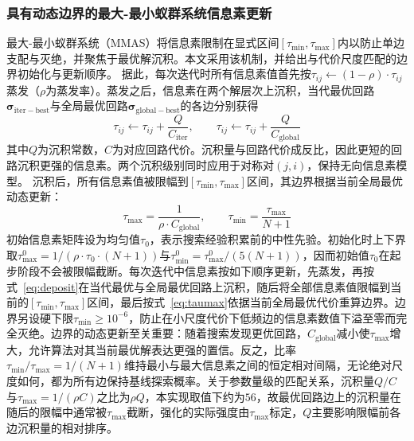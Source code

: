 \documentclass[lettersize,journal]{IEEEtran}
\begin{document}
\subsubsection{具有动态边界的最大-最小蚁群系统信息素更新}
最大-最小蚁群系统（MMAS）\textcolor{blue}{\cite{ref23}}将信息素限制在显式区间$[\tau_{\min}, \tau_{\max}]$内以防止单边支配与灭绝，并聚焦于最优解沉积。本文采用该机制，并给出与代价尺度匹配的边界初始化与更新顺序。
据此，每次迭代时所有信息素值首先按$\tau_{ij} \leftarrow (1 - \rho) \cdot \tau_{ij}$蒸发（$\rho$为蒸发率）。蒸发之后，信息素在两个解层次上沉积，当代最优回路$\bm{\sigma}_{\mathrm{iter-best}}$与全局最优回路$\bm{\sigma}_{\mathrm{global-best}}$的各边分别获得
\begin{equation}
\tau_{ij} \leftarrow \tau_{ij} + \frac{Q}{C_{\mathrm{iter}}}, \qquad
\tau_{ij} \leftarrow \tau_{ij} + \frac{Q}{C_{\mathrm{global}}}
\label{eq:deposit}
\end{equation}
其中$Q$为沉积常数，$C$为对应回路代价。沉积量与回路代价成反比，因此更短的回路沉积更强的信息素。两个沉积级别同时应用于对称对$(j, i)$，保持无向信息素模型。
沉积后，所有信息素值被限幅到$[\tau_{\min}, \tau_{\max}]$区间，其边界根据当前全局最优动态更新：
\begin{equation}
\tau_{\max} = \frac{1}{\rho \cdot C_{\mathrm{global}}}, \qquad
\tau_{\min} = \frac{\tau_{\max}}{N+1}
\label{eq:taumax}
\end{equation}
初始信息素矩阵设为均匀值$\tau_0$，表示搜索经验积累前的中性先验。初始化时上下界取$\tau_{\max}^{0} = 1/(\rho \cdot \tau_0 \cdot (N+1))$与$\tau_{\min}^{0} = \tau_{\max}^{0}/(5(N+1))$，因而初始值$\tau_0$在起步阶段不会被限幅截断。每次迭代中信息素按如下顺序更新，先蒸发，再按式~\textcolor{blue}{\eqref{eq:deposit}}在当代最优与全局最优回路上沉积，随后将全部信息素值限幅到当前的$[\tau_{\min}, \tau_{\max}]$区间，最后按式~\textcolor{blue}{\eqref{eq:taumax}}依据当前全局最优代价重算边界。边界另设硬下限$\tau_{\min} \geq 10^{-6}$，防止在小尺度代价下低频边的信息素数值下溢至零而完全灭绝。边界的动态更新至关重要：随着搜索发现更优回路，$C_{\mathrm{global}}$减小使$\tau_{\max}$增大，允许算法对其当前最优解表达更强的置信。反之，比率$\tau_{\min}/\tau_{\max} = 1/(N+1)$维持最小与最大信息素之间的恒定相对间隔，无论绝对尺度如何，都为所有边保持基线探索概率。关于参数量级的匹配关系，沉积量$Q/C$与$\tau_{\max} = 1/(\rho C)$之比为$\rho Q$，本实现取值下约为$56$，故最优回路边上的沉积量在随后的限幅中通常被$\tau_{\max}$截断，强化的实际强度由$\tau_{\max}$标定，$Q$主要影响限幅前各边沉积量的相对排序。
\end{document}
